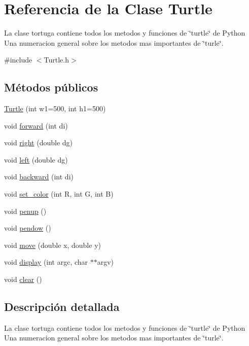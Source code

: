 \hypertarget{classTurtle}{}\section{Referencia de la Clase Turtle}
\label{classTurtle}


La clase tortuga contiene todos los metodos y funciones de \char`\"{}turtle\char`\"{} de Python  Una numeracion general sobre los metodos mas importantes de \char`\"{}turle\char`\"{}.  




{\ttfamily \#include $<$Turtle.\+h$>$}

\subsection*{Métodos públicos}
\begin{DoxyCompactItemize}
\item 
\hyperlink{classTurtle_a0a42aeefa221e7a0598e0af222214788}{Turtle} (int w1=500, int h1=500)
\item 
void \hyperlink{classTurtle_a8597b5fb6ad6abc2888a7246ffcf971c}{forward} (int di)
\item 
void \hyperlink{classTurtle_ad389432bb8cde6832c0fe1f76c891e94}{right} (double dg)
\item 
void \hyperlink{classTurtle_a8ba2af4d351e62de83ddfcc6bca51d9a}{left} (double dg)
\item 
void \hyperlink{classTurtle_a0cd2bf8afff89d89662f296dc781bb79}{backward} (int di)
\item 
void \hyperlink{classTurtle_ad4f1cfec231a2d91c529d20c2331168b}{set\+\_\+color} (int R, int G, int B)
\item 
void \hyperlink{classTurtle_a40367ef16bd84c7d382992b8e6d3a9fc}{penup} ()
\item 
void \hyperlink{classTurtle_aabe573f505a789dfe84fc2219ec0cb10}{pendow} ()
\item 
void \hyperlink{classTurtle_a486b5b199b51322309f969dd2c028fae}{move} (double x, double y)
\item 
void \hyperlink{classTurtle_ae62d0d6d90add2c86baa14ae01cdbe4a}{display} (int argc, char $\ast$$\ast$argv)
\item 
void \hyperlink{classTurtle_ad065d9fd92fa5eaee2b808f52c444838}{clear} ()
\end{DoxyCompactItemize}


\subsection{Descripción detallada}
La clase tortuga contiene todos los metodos y funciones de \char`\"{}turtle\char`\"{} de Python  Una numeracion general sobre los metodos mas importantes de \char`\"{}turle\char`\"{}. 

